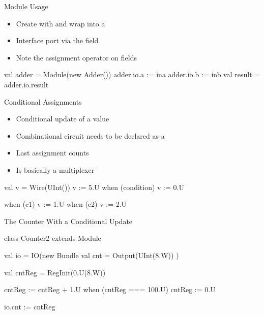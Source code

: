 \begin{frame}[fragile]{Module Usage}
\begin{itemize}
\item Create with  and wrap into a 
\item Interface port via the  field
\item Note the assignment operator \code{:=} on  fields
\end{itemize}
\begin{chisel}
  val adder = Module(new Adder())
  adder.io.a := ina
  adder.io.b := inb
  val result = adder.io.result
\end{chisel}
\end{frame}

\begin{frame}[fragile]{Conditional Assignments}
\begin{itemize}
\item Conditional update of a value
\item Combinational circuit needs to be declared as a 
\item Last assignment counts
\item Is basically a multiplexer
\end{itemize}
\begin{chisel}
  val v = Wire(UInt())
  v := 5.U
  when (condition) {
    v := 0.U
  }

  when (c1) { v := 1.U }
  when (c2) { v := 2.U }
\end{chisel}
\end{frame}

\begin{frame}[fragile]{The Counter With a Conditional Update}
\begin{chisel}
class Counter2 extends Module {
  val io = IO(new Bundle {
    val cnt = Output(UInt(8.W))
  })

  val cntReg = RegInit(0.U(8.W))

  cntReg := cntReg + 1.U
  when (cntReg === 100.U) {
    cntReg := 0.U
  }

  io.cnt := cntReg
}
\end{chisel}
\end{frame}

